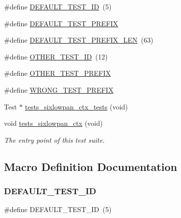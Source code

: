 \begin{DoxyCompactItemize}
\item 
\#define \hyperlink{tests-sixlowpan__ctx_8c_affce6de3bcc3c13b063477064aff4c4b}{D\+E\+F\+A\+U\+L\+T\+\_\+\+T\+E\+S\+T\+\_\+\+ID}~(5)
\item 
\#define \hyperlink{tests-sixlowpan__ctx_8c_a7fe2d3d422d0aa0e034014d99c2417cb}{D\+E\+F\+A\+U\+L\+T\+\_\+\+T\+E\+S\+T\+\_\+\+P\+R\+E\+F\+IX}
\item 
\#define \hyperlink{tests-sixlowpan__ctx_8c_a277f9b189575eb484042d73562e0fb81}{D\+E\+F\+A\+U\+L\+T\+\_\+\+T\+E\+S\+T\+\_\+\+P\+R\+E\+F\+I\+X\+\_\+\+L\+EN}~(63)
\item 
\#define \hyperlink{tests-sixlowpan__ctx_8c_a79c72e56063586e96a4e9248d80c8c46}{O\+T\+H\+E\+R\+\_\+\+T\+E\+S\+T\+\_\+\+ID}~(12)
\item 
\#define \hyperlink{tests-sixlowpan__ctx_8c_a348aa4ae6b70240601231dec6416d95f}{O\+T\+H\+E\+R\+\_\+\+T\+E\+S\+T\+\_\+\+P\+R\+E\+F\+IX}
\item 
\#define \hyperlink{tests-sixlowpan__ctx_8c_a2c8be2af9e1a6f9321a0e6c8fcbe162d}{W\+R\+O\+N\+G\+\_\+\+T\+E\+S\+T\+\_\+\+P\+R\+E\+F\+IX}
\item 
Test $\ast$ \hyperlink{tests-sixlowpan__ctx_8c_a968c464332df2177e1f80e679648ebf9}{tests\+\_\+sixlowpan\+\_\+ctx\+\_\+tests} (void)
\item 
void \hyperlink{group__unittests_gaf9311b39cb1410823a35205c822900d9}{tests\+\_\+sixlowpan\+\_\+ctx} (void)
\begin{DoxyCompactList}\small\item\em The entry point of this test suite. \end{DoxyCompactList}\end{DoxyCompactItemize}


\subsection{Macro Definition Documentation}
\mbox{\label{tests-sixlowpan__ctx_8c_affce6de3bcc3c13b063477064aff4c4b}} 
\subsubsection{\texorpdfstring{D\+E\+F\+A\+U\+L\+T\+\_\+\+T\+E\+S\+T\+\_\+\+ID}{DEFAULT\_TEST\_ID}}
{\footnotesize\ttfamily \#define D\+E\+F\+A\+U\+L\+T\+\_\+\+T\+E\+S\+T\+\_\+\+ID~(5)}

